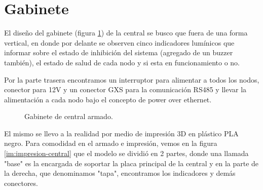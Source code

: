 \section{Gabinete}
\par El diseño del gabinete (figura \ref{im:gabinete-central}) de la central se busco que fuera de una forma vertical, en donde por delante se observen cinco indicadores lumínicos que informar sobre el estado de inhibición del sistema (agregado de un buzzer también), el estado de salud de cada nodo y si esta en funcionamiento o no.
\par Por la parte trasera encontramos un interruptor para alimentar a todos los nodos, conector para 12V y un conector GXS para la comunicación RS485 y llevar la alimentación a cada nodo bajo el concepto de power over ethernet. 
\begin{figure}[!h]
\begin{center}
    \caption{Gabinete de central armado.}
	\label{im:gabinete-central}
\end{center}
\end{figure}

\par El mismo se llevo a la realidad por medio de impresión 3D en plástico PLA negro. Para comodidad en el armado e impresión, vemos en la figura \ref{im:impresion-central} que el modelo se dividió en 2 partes, donde una llamada "base" es la encargada de soportar la placa principal de la central y en la parte de la derecha, que denominamos "tapa", encontramos los indicadores y demás conectores. 


